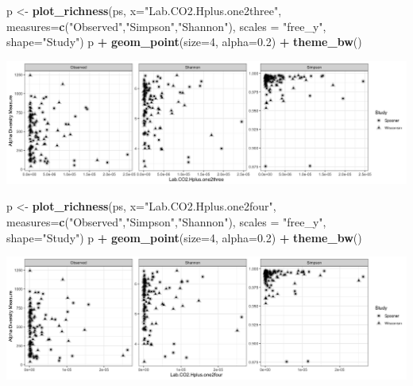\documentclass[]{article}
\newenvironment{Shaded}{\begin{snugshade}}{\end{snugshade}}
\newcommand{\DataTypeTok}[1]{\textcolor[rgb]{0.13,0.29,0.53}{#1}}
\newcommand{\DecValTok}[1]{\textcolor[rgb]{0.00,0.00,0.81}{#1}}
\newcommand{\FloatTok}[1]{\textcolor[rgb]{0.00,0.00,0.81}{#1}}
\newcommand{\KeywordTok}[1]{\textcolor[rgb]{0.13,0.29,0.53}{\textbf{#1}}}
\newcommand{\NormalTok}[1]{#1}
\newcommand{\OperatorTok}[1]{\textcolor[rgb]{0.81,0.36,0.00}{\textbf{#1}}}
\newcommand{\StringTok}[1]{\textcolor[rgb]{0.31,0.60,0.02}{#1}}
\begin{document}
\begin{Shaded}
\begin{Highlighting}[]
\NormalTok{p <-}\StringTok{ }\KeywordTok{plot_richness}\NormalTok{(ps, }\DataTypeTok{x=}\StringTok{"Lab.CO2.Hplus.one2three"}\NormalTok{, }\DataTypeTok{measures=}\KeywordTok{c}\NormalTok{(}\StringTok{"Observed"}\NormalTok{,}\StringTok{"Simpson"}\NormalTok{,}\StringTok{"Shannon"}\NormalTok{), }\DataTypeTok{scales =} \StringTok{"free_y"}\NormalTok{, }\DataTypeTok{shape=}\StringTok{"Study"}\NormalTok{)}
\NormalTok{p }\OperatorTok{+}\StringTok{ }\KeywordTok{geom_point}\NormalTok{(}\DataTypeTok{size=}\DecValTok{4}\NormalTok{, }\DataTypeTok{alpha=}\FloatTok{0.2}\NormalTok{) }\OperatorTok{+}\StringTok{ }\KeywordTok{theme_bw}\NormalTok{()}
\end{Highlighting}
\end{Shaded}

\includegraphics{output-rmd/richness-ph-Lab.CO2.Hplus.one2three-1.png}

\begin{Shaded}
\begin{Highlighting}[]
\NormalTok{p <-}\StringTok{ }\KeywordTok{plot_richness}\NormalTok{(ps, }\DataTypeTok{x=}\StringTok{"Lab.CO2.Hplus.one2four"}\NormalTok{, }\DataTypeTok{measures=}\KeywordTok{c}\NormalTok{(}\StringTok{"Observed"}\NormalTok{,}\StringTok{"Simpson"}\NormalTok{,}\StringTok{"Shannon"}\NormalTok{), }\DataTypeTok{scales =} \StringTok{"free_y"}\NormalTok{, }\DataTypeTok{shape=}\StringTok{"Study"}\NormalTok{)}
\NormalTok{p }\OperatorTok{+}\StringTok{ }\KeywordTok{geom_point}\NormalTok{(}\DataTypeTok{size=}\DecValTok{4}\NormalTok{, }\DataTypeTok{alpha=}\FloatTok{0.2}\NormalTok{) }\OperatorTok{+}\StringTok{ }\KeywordTok{theme_bw}\NormalTok{()}
\end{Highlighting}
\end{Shaded}

\includegraphics{output-rmd/richness-ph-Lab.CO2.Hplus.one2four-1.png}
\end{document}
